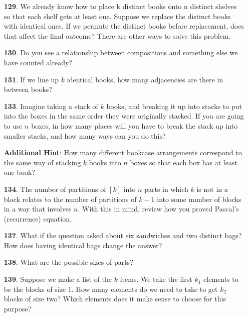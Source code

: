 \documentclass[10pt,]{book}
\theoremstyle{plain}
\theoremstyle{definition}
\theoremstyle{definition}
\numberwithin{equation}{chapter}
\begin{document}
\begin{itemize}[itemsep=1em]
\item[\textbf{129}.]\hypertarget{p-774}{}%
We already know how to place k distinct books onto n distinct shelves so that each shelf gets at least one. Suppose we replace the distinct books with identical ones. If we permute the distinct books before replacement, does that affect the final outcome? There are other ways to solve this problem.%

\item[\textbf{130}.]\hypertarget{p-777}{}%
Do you see a relationship between compositions and something else we have counted already?%

\item[\textbf{131}.]\hypertarget{p-780}{}%
If we line up \(k\) identical books, how many adjacencies are there in between books?%

\item[\textbf{133}.]\hypertarget{p-786}{}%
Imagine taking a stack of \(k\) books, and breaking it up into stacks to put into the boxes in the same order they were originally stacked. If you are going to use \(n\) boxes, in how many places will you have to break the stack up into smaller stacks, and how many ways can you do this?%

\par\smallskip
\noindent\textbf{Additional Hint}: \hypertarget{p-787}{}%
How many different bookcase arrangements correspond to the same way of stacking \(k\) books into \(n\) boxes so that each box has at least one book?%

\item[\textbf{134}.]\hypertarget{p-797}{}%
The number of partitions of \([k]\) into \(n\) parts in which \(k\) is not in a block relates to the number of partitions of \(k-1\) into some number of blocks in a way that involves \(n\). With this in mind, review how you proved Pascal's (recurrence) equation.%

\item[\textbf{137}.]\hypertarget{p-805}{}%
What if the question asked about six sandwiches and two distinct bags? How does having identical bags change the answer?%

\item[\textbf{138}.]\hypertarget{p-808}{}%
What are the possible sizes of parts?%

\item[\textbf{139}.]\hypertarget{p-811}{}%
Suppose we make a list of the \(k\) items. We take the first \(k_1\) elements to be the blocks of size 1. How many elements do we need to take to get \(k_2\) blocks of size two? Which elements does it make sense to choose for this purpose?%


\end{itemize}
\end{document}
